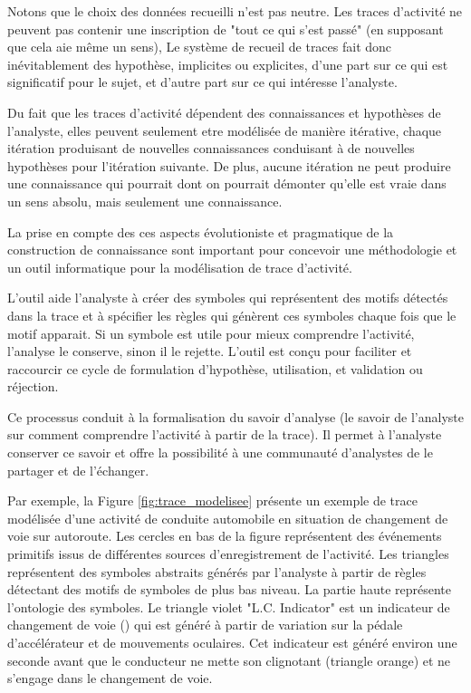  
Notons que le choix des données recueilli n'est pas neutre.
Les traces d'activité ne peuvent pas contenir une inscription de "tout ce qui s'est passé" (en supposant que cela aie même un sens), 
Le système de recueil de traces fait donc inévitablement des hypothèse, implicites ou explicites, d'une part sur ce qui est significatif pour le sujet, et d'autre part sur ce qui intéresse l'analyste. 
 
Du fait que les traces d'activité dépendent des connaissances et hypothèses de l'analyste, elles peuvent seulement etre modélisée de manière itérative, chaque itération produisant de nouvelles connaissances conduisant à de nouvelles hypothèses pour l'itération suivante. 
De plus, aucune itération ne peut produire une connaissance qui pourrait dont on pourrait démonter qu'elle est vraie dans un sens absolu, mais seulement une connaissance. 

La prise en compte des ces aspects évolutioniste et pragmatique de la construction de connaissance sont important pour concevoir une méthodologie et un outil informatique pour la modélisation de trace d'activité. 

L'outil aide l'analyste à créer des  symboles qui représentent des motifs détectés dans la trace et à spécifier les règles qui génèrent ces symboles chaque fois que le motif apparait. 
Si un symbole est utile pour mieux comprendre l'activité, l'analyse le conserve, sinon il le rejette. 
L'outil est conçu pour faciliter et raccourcir ce cycle de formulation d'hypothèse, utilisation, et validation ou réjection.

Ce processus conduit à la formalisation du savoir d'analyse (le savoir de l'analyste sur comment comprendre l'activité à partir de la trace). 
Il permet à l'analyste conserver ce savoir et offre la possibilité à une communauté d'analystes de le partager et de l'échanger. 

Par exemple, la Figure \ref{fig:trace_modelisee} présente un exemple de trace modélisée d'une activité de conduite automobile en situation de changement de voie sur autoroute. 
Les cercles en bas de la figure représentent des événements primitifs issus de différentes sources d'enregistrement de l'activité. 
Les triangles représentent des symboles abstraits générés par l'analyste à partir de règles détectant des motifs de symboles de plus bas niveau. 
La partie haute représente l'ontologie des symboles. 
Le triangle violet "L.C. Indicator" est un indicateur de changement de voie () qui est généré à partir de variation sur la pédale d'accélérateur et de mouvements oculaires. Cet indicateur est généré environ une seconde avant que le conducteur ne mette son clignotant (triangle orange) et ne s'engage dans le changement de voie. 

